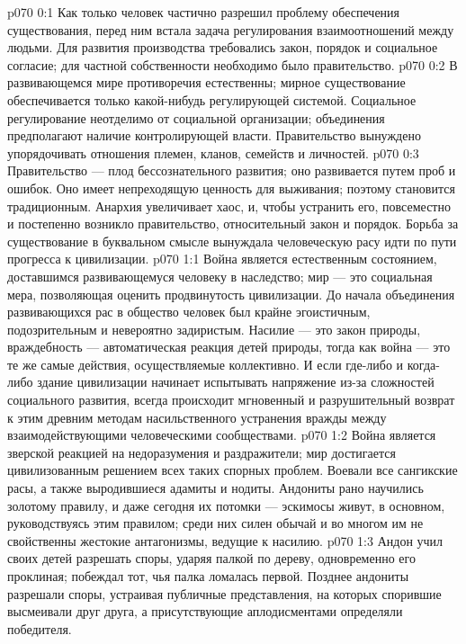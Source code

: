 \author{Мелхиседек}
\vs p070 0:1 Как только человек частично разрешил проблему обеспечения существования, перед ним встала задача регулирования взаимоотношений между людьми. Для развития производства требовались закон, порядок и социальное согласие; для частной собственности необходимо было правительство.
\vs p070 0:2 В развивающемся мире противоречия естественны; мирное существование обеспечивается только какой\hyp{}нибудь регулирующей системой. Социальное регулирование неотделимо от социальной организации; объединения предполагают наличие контролирующей власти. Правительство вынуждено упорядочивать отношения племен, кланов, семейств и личностей.
\vs p070 0:3 Правительство --- плод бессознательного развития; оно развивается путем проб и ошибок. Оно имеет непреходящую ценность для выживания; поэтому становится традиционным. Анархия увеличивает хаос, и, чтобы устранить его, повсеместно и постепенно возникло правительство, относительный закон и порядок. Борьба за существование в буквальном смысле вынуждала человеческую расу идти по пути прогресса к цивилизации.
\vs p070 1:1 Война является естественным состоянием, доставшимся развивающемуся человеку в наследство; мир --- это социальная мера, позволяющая оценить продвинутость цивилизации. До начала объединения развивающихся рас в общество человек был крайне эгоистичным, подозрительным и невероятно задиристым. Насилие --- это закон природы, враждебность --- автоматическая реакция детей природы, тогда как война --- это те же самые действия, осуществляемые коллективно. И если где\hyp{}либо и когда\hyp{}либо здание цивилизации начинает испытывать напряжение из\hyp{}за сложностей социального развития, всегда происходит мгновенный и разрушительный возврат к этим древним методам насильственного устранения вражды между взаимодействующими человеческими сообществами.
\vs p070 1:2 Война является зверской реакцией на недоразумения и раздражители; мир достигается цивилизованным решением всех таких спорных проблем. Воевали все сангикские расы, а также выродившиеся адамиты и нодиты. Андониты рано научились золотому правилу, и даже сегодня их потомки --- эскимосы живут, в основном, руководствуясь этим правилом; среди них силен обычай и во многом им не свойственны жестокие антагонизмы, ведущие к насилию.
\vs p070 1:3 Андон учил своих детей разрешать споры, ударяя палкой по дереву, одновременно его проклиная; побеждал тот, чья палка ломалась первой. Позднее андониты разрешали споры, устраивая публичные представления, на которых спорившие высмеивали друг друга, а присутствующие аплодисментами определяли победителя.
